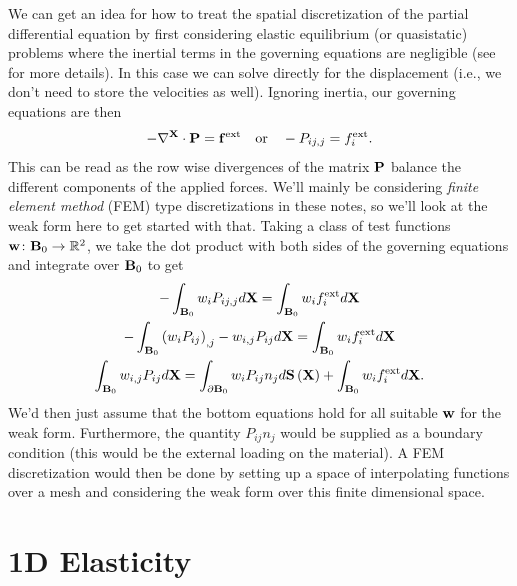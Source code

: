 We can get an idea for how to treat the spatial discretization of the partial differential equation by first considering elastic equilibrium (or quasistatic) problems where the inertial terms in the governing equations are negligible (see \cite{Teran05a} for more details). In this case we can solve directly for the displacement (i.e., we don't need to store the velocities as well). Ignoring inertia, our governing equations are then
\begin{equation*}
-\nabla^{\mathbf{X}} \cdot \mathbf{P} = \mathbf{f}^{\text{ext}} \quad \text{or} \quad -P_{ij,j} = f^{\text{ext}}_i.
\end{equation*}
This can be read as the row wise divergences of the matrix $\mathbf{P}$ balance the different components of the applied forces. We'll mainly be considering \emph{finite element method} (FEM) type discretizations in these notes, so we'll look at the weak form here to get started with that. Taking a class of test functions $\mathbf{w} \colon \mathbf{B}_0 \to \mathbb{R}^2$, we take the dot product with both sides of the governing equations and integrate over $\mathbf{B}_0$ to get
\begin{gather*}
-\int_{\mathbf{B}_0} w_i P_{ij,j} d\mathbf{X} = \int_{\mathbf{B}_0} w_i f^{\text{ext}}_i d\mathbf{X} \\
-\int_{\mathbf{B}_0} \left( w_i P_{ij} \right)_{,j} - w_{i,j} P_{ij} d\mathbf{X} = \int_{\mathbf{B}_0} w_i f^{\text{ext}}_i d\mathbf{X} \\
\int_{\mathbf{B}_0} w_{i,j} P_{ij} d\mathbf{X} = \int_{\partial\mathbf{B}_0} w_i P_{ij} n_j d\mathbf{S} \left( \mathbf{X} \right) + \int_{\mathbf{B}_0} w_i f^{\text{ext}}_i d\mathbf{X}.
\end{gather*}
We'd then just assume that the bottom equations hold for all suitable $\mathbf{w}$ for the weak form. Furthermore, the quantity $P_{ij} n_j$ would be supplied as a boundary condition (this would be the external loading on the material). A FEM discretization would then be done by setting up a space of interpolating functions over a mesh and considering the weak form over this finite dimensional space.

\section*{1D Elasticity}

